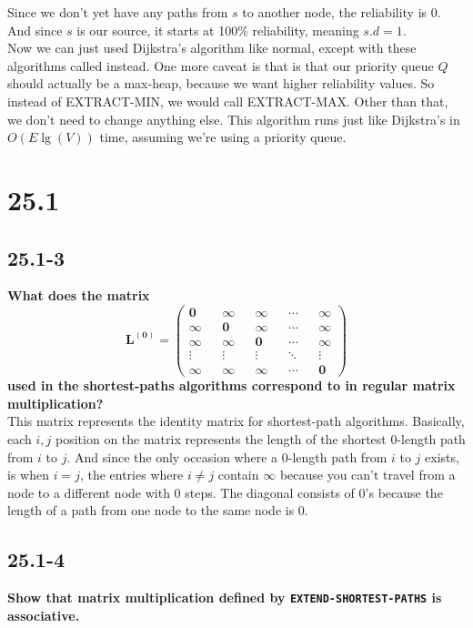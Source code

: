 \documentclass[11pt]{article}
\begin{document}
Since we don't yet have any paths from \(s\) to another node, the reliability is 0.  And since 
\(s\) is our source, it starts at 100\% reliability, meaning \(s.d=1\). \\

Now we can just used Dijkstra's algorithm like normal, except with these algorithms called instead. 
One more caveat is that is that our priority queue \(Q\) should actually be a max-heap, because we 
want higher reliability values.  So instead of EXTRACT-MIN, we would call EXTRACT-MAX.  Other than 
that, we don't need to change anything else.  This algorithm runs just like Dijkstra's in 
\(O(E\lg(V))\) time, assuming we're using a priority queue.
 \newpage

 \section*{25.1}
 \subsection*{25.1-3}
 \textbf{What does the matrix}
 \[\mathbf{
   L^{(0)} = \begin{pmatrix*}
     0 && \infty && \infty && \cdots && \infty \\
     \infty && 0 && \infty && \cdots && \infty \\
     \infty && \infty && 0 && \cdots && \infty \\
     \vdots && \vdots && \vdots && \ddots && \vdots \\
     \infty && \infty && \infty && \cdots && 0
   \end{pmatrix*}
 }\]
 \textbf{used in the shortest-paths algorithms correspond to in regular matrix multiplication?} \\ 

 This matrix represents the identity matrix for shortest-path algorithms.  Basically, each \(i,j\) 
 position on the matrix represents the length of the shortest 0-length path from \(i\) to \(j\).  
 And since the only occasion where a 0-length path from \(i\) to \(j\) exists, is when \(i=j\), the 
 entries where \(i \not= j\) contain \(\infty\) because you can't travel from a node to a different 
 node with 0 steps.  The diagonal consists of 0's because the length of a path from one node to the 
 same node is 0.
 \newpage

 \subsection*{25.1-4}
 \textbf{Show that matrix multiplication defined by \texttt{EXTEND-SHORTEST-PATHS} is associative.} \\
\end{document}
